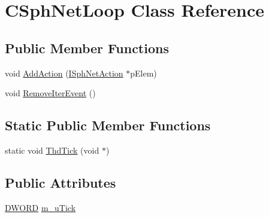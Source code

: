 \hypertarget{classCSphNetLoop}{\section{C\-Sph\-Net\-Loop Class Reference}
\label{classCSphNetLoop}
}
\subsection*{Public Member Functions}
\begin{DoxyCompactItemize}
\item 
void \hyperlink{classCSphNetLoop_a8c747409d637f464804144052e4132a2}{Add\-Action} (\hyperlink{structISphNetAction}{I\-Sph\-Net\-Action} $\ast$p\-Elem)
\item 
void \hyperlink{classCSphNetLoop_a31108fb8e5481ea91f926bd9ce60eb81}{Remove\-Iter\-Event} ()
\end{DoxyCompactItemize}
\subsection*{Static Public Member Functions}
\begin{DoxyCompactItemize}
\item 
static void \hyperlink{classCSphNetLoop_a65ea7c20ab049f2e369b20e585f98590}{Thd\-Tick} (void $\ast$)
\end{DoxyCompactItemize}
\subsection*{Public Attributes}
\begin{DoxyCompactItemize}
\item 
\hyperlink{sphinxstd_8h_a798af1e30bc65f319c1a246cecf59e39}{D\-W\-O\-R\-D} \hyperlink{classCSphNetLoop_af12e17a09dcd10377cfa6010295981ac}{m\-\_\-u\-Tick}
\end{DoxyCompactItemize}
